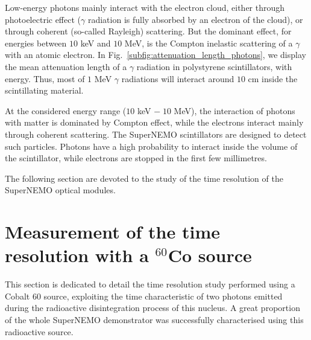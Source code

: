 Low-energy photons mainly interact with the electron cloud, either through photoelectric effect ($\gamma$ radiation is fully absorbed by an electron of the cloud), or through coherent (so-called Rayleigh) scattering.
But the dominant effect, for energies between $10$ keV and $10$ MeV, is the Compton inelastic scattering of a $\gamma$ with an atomic electron.
In Fig.~\ref{subfig:attenuation_length_photons}, we display the mean attenuation length of a $\gamma$ radiation in polystyrene scintillators, with energy.
Thus, most of $1$ MeV $\gamma$ radiations will interact around $10$ cm inside the scintillating material.

At the considered energy range ($10$ keV $ -\; 10$ MeV), the interaction of photons with matter is dominated by Compton effect, while the electrons interact mainly through coherent scattering.
The SuperNEMO scintillators are designed to detect such particles.
Photons have a high probability to interact inside the volume of the scintillator, while electrons are stopped in the first few millimetres.

The following section are devoted to the study of the time resolution of the SuperNEMO optical modules.



\section{Measurement of the time resolution with a $^{60}$Co source}
\label{sec:Co_analysis}
This section is dedicated to detail the time resolution study performed using a Cobalt $60$ source, exploiting the time characteristic of two photons emitted during the radioactive disintegration process of this nucleus.
A great proportion of the whole SuperNEMO demonstrator was successfully characterised using this radioactive source.


